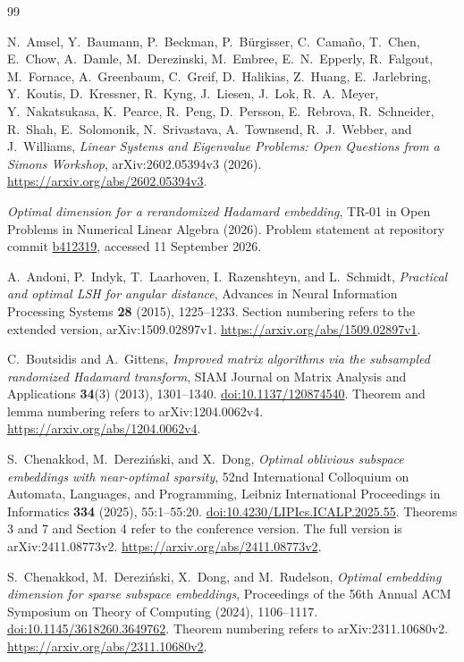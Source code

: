 \documentclass[11pt]{article}
\theoremstyle{definition}
\theoremstyle{remark}
\theoremstyle{plain}
\begin{document}
\begin{thebibliography}{99}

N.~Amsel, Y.~Baumann, P.~Beckman, P.~B\"urgisser, C.~Cama\~no,
T.~Chen, E.~Chow, A.~Damle, M.~Derezinski, M.~Embree,
E.~N.~Epperly, R.~Falgout, M.~Fornace, A.~Greenbaum, C.~Greif,
D.~Halikias, Z.~Huang, E.~Jarlebring, Y.~Koutis, D.~Kressner,
R.~Kyng, J.~Liesen, J.~Lok, R.~A.~Meyer, Y.~Nakatsukasa,
K.~Pearce, R.~Peng, D.~Persson, E.~Rebrova, R.~Schneider,
R.~Shah, E.~Solomonik, N.~Srivastava, A.~Townsend, R.~J.~Webber,
and J.~Williams,
\emph{Linear Systems and Eigenvalue Problems: Open Questions from
a Simons Workshop}, arXiv:2602.05394v3 (2026).
\url{https://arxiv.org/abs/2602.05394v3}.

\emph{Optimal dimension for a rerandomized Hadamard embedding},
TR-01 in Open Problems in Numerical Linear Algebra (2026).
Problem statement at repository commit
\href{https://github.com/ajt60gaibb/OpenProblemsInNLA/blob/b4123194697bdf6f8f82518c1dd7d6c40a30c2e0/randomized-and-low-rank-approximation/TR-01/problem.tex}{b412319}, accessed 11 September 2026.

A.~Andoni, P.~Indyk, T.~Laarhoven, I.~Razenshteyn, and L.~Schmidt,
\emph{Practical and optimal LSH for angular distance},
Advances in Neural Information Processing Systems \textbf{28}
(2015), 1225--1233.
Section numbering refers to the extended version, arXiv:1509.02897v1.
\url{https://arxiv.org/abs/1509.02897v1}.

C.~Boutsidis and A.~Gittens,
\emph{Improved matrix algorithms via the subsampled randomized
Hadamard transform},
SIAM Journal on Matrix Analysis and Applications \textbf{34}(3)
(2013), 1301--1340.
\href{https://doi.org/10.1137/120874540}{doi:10.1137/120874540}.
Theorem and lemma numbering refers to arXiv:1204.0062v4.
\url{https://arxiv.org/abs/1204.0062v4}.

S.~Chenakkod, M.~Derezi\'nski, and X.~Dong,
\emph{Optimal oblivious subspace embeddings with near-optimal sparsity},
52nd International Colloquium on Automata, Languages, and Programming,
Leibniz International Proceedings in Informatics \textbf{334}
(2025), 55:1--55:20.
\href{https://doi.org/10.4230/LIPIcs.ICALP.2025.55}{doi:10.4230/LIPIcs.ICALP.2025.55}.
Theorems 3 and 7 and Section 4 refer to the conference version.
The full version is arXiv:2411.08773v2.
\url{https://arxiv.org/abs/2411.08773v2}.

S.~Chenakkod, M.~Derezi\'nski, X.~Dong, and M.~Rudelson,
\emph{Optimal embedding dimension for sparse subspace embeddings},
Proceedings of the 56th Annual ACM Symposium on Theory of Computing
(2024), 1106--1117.
\href{https://doi.org/10.1145/3618260.3649762}{doi:10.1145/3618260.3649762}.
Theorem numbering refers to arXiv:2311.10680v2.
\url{https://arxiv.org/abs/2311.10680v2}.


\end{thebibliography}
\end{document}
